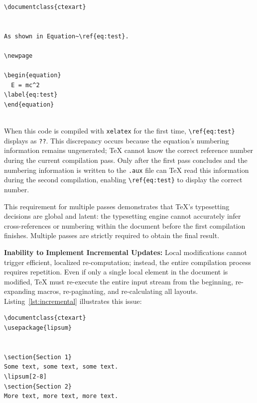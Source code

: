 \begin{lstlisting}[caption={Cross-reference before definition},label={lst:xref-before-def}]
\documentclass{ctexart}


As shown in Equation~\ref{eq:test}.

\newpage

\begin{equation}
  E = mc^2
\label{eq:test}
\end{equation}


\end{lstlisting}

When this code is compiled with \texttt{xelatex} for the first time, \texttt{\textbackslash ref\{eq:test\}} displays as \texttt{??}. This discrepancy occurs because the equation's numbering information remains ungenerated; \TeX{} cannot know the correct reference number during the current compilation pass. Only after the first pass concludes and the numbering information is written to the \texttt{.aux} file can \TeX{} read this information during the second compilation, enabling \texttt{\textbackslash ref\{eq:test\}} to display the correct number.

This requirement for multiple passes demonstrates that \TeX{}'s typesetting decisions are global and latent: the typesetting engine cannot accurately infer cross-references or numbering within the document before the first compilation finishes. Multiple passes are strictly required to obtain the final result.

\textbf{Inability to Implement Incremental Updates:} Local modifications cannot trigger efficient, localized re-computation; instead, the entire compilation process requires repetition. Even if only a single local element in the document is modified, \TeX{} must re-execute the entire input stream from the beginning, re-expanding macros, re-paginating, and re-calculating all layouts. Listing~\ref{lst:incremental} illustrates this issue:

\begin{lstlisting}[caption={Incremental update example},label={lst:incremental}]
\documentclass{ctexart}
\usepackage{lipsum}


\section{Section 1}
Some text, some text, some text.
\lipsum[2-8]
\section{Section 2}
More text, more text, more text.


\end{lstlisting}


